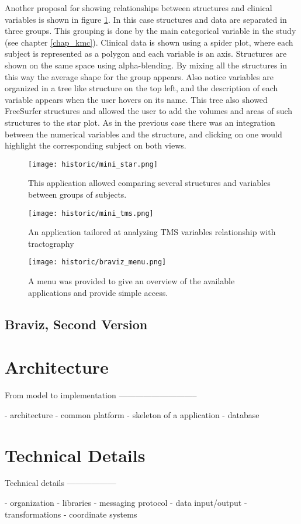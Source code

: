Another proposal for showing relationships between structures and clinical variables is shown in figure \ref{fig_star_1}. In this case structures and data are separated in three groups. This grouping is done by the main categorical variable in the study (see chapter \ref{chap_kmc}). Clinical data is shown using a spider plot, where each subject is represented as a polygon and each variable is an axis. Structures are shown on the same space using alpha-blending. By mixing all the structures in this way the average shape for the group appears. Also notice variables are organized in a tree like structure on the top left, and the description of each variable appears when the user hovers on its name. This tree also showed FreeSurfer structures and allowed the user to add the volumes and areas of such structures to the star plot. As in the previous case there was an integration between the numerical variables and the structure, and clicking on one would highlight the corresponding subject on both views.

\begin{figure}
\centering
\texttt{[image: historic/mini\_star.png]} 
\caption{\label{fig_star_1}This application allowed comparing several structures and variables between groups of subjects.}
\end{figure}

\begin{figure}
\centering
\texttt{[image: historic/mini\_tms.png]} 
\caption{\label{fig_tms_1}An application tailored at analyzing TMS variables relationship with tractography}
\end{figure}

\begin{figure}
\centering
\texttt{[image: historic/braviz\_menu.png]} 
\caption{\label{fig_menu_1}A menu was provided to give an overview of the available applications and provide simple access.}
\end{figure}


\subsection{Braviz, Second Version}



\section{Architecture}

From model to implementation
-----------------------------

- architecture
- common platform
- skeleton of a application
- database


\section{Technical Details}

Technical details
------------------

- organization
- libraries
- messaging protocol
- data input/output
- transformations
- coordinate systems



